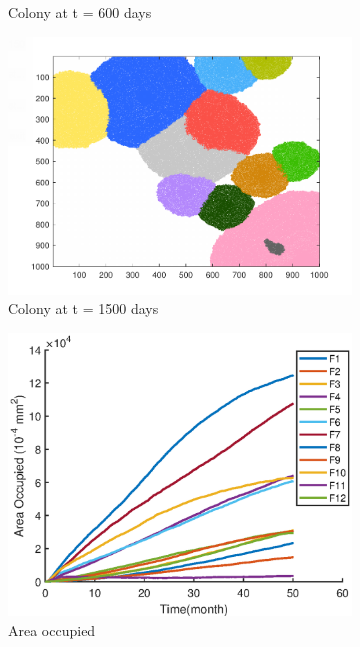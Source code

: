 \documentclass[a4paper,12pt]{article}
\begin{document}
\begin{figure}[H]
\begin{subfigure}{0.3\textwidth}
		\caption{Colony at t = 600 days}
		\label{Eg_colony600}
	\end{subfigure}
	\begin{subfigure}{0.3\textwidth}
			\includegraphics[width=\textwidth]{./picture/Eg_1500day.pdf}
			\caption{Colony at t = 1500 days}
			\label{Eg_colony1500}
	\end{subfigure}
	\begin{subfigure}{0.3\textwidth}
		\includegraphics[width=\textwidth]{./picture/Eg_junsi.eps}
		\caption{Area occupied}
		\label{Eg_area}
	\end{subfigure}
	\begin{subfigure}{0.3\textwidth}

\end{subfigure}
\end{figure}
\end{document}
